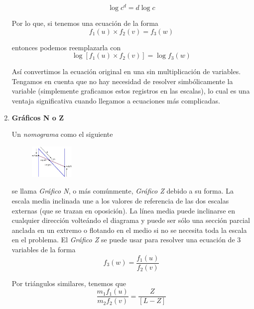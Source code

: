 \documentclass[letterpaper,11pt]{article}
\begin{document}
\begin{enumerate}
    \begin{equation*}
        \log c^d = d \log c
    \end{equation*}

    Por lo que, si tenemos una ecuación de la forma 
    \begin{equation*}
        f_1 (u) \times f_2 (v) = f_3 (w)
    \end{equation*}

    entonces podemos reemplazarla con 
    \begin{equation*}
        \log [f_1 (u) \times f_2 (v)] = \log f_3 (w)
    \end{equation*}

    Así convertimos la ecuación original en una sin multiplicación de variables.
    Tengamos en cuenta que no hay necesidad de resolver simbólicamente la 
    variable (simplemente graficamos estos registros en las escalas), lo cual 
    es una ventaja significativa cuando llegamos a ecuaciones más complicadas.

    \item \textbf{Gráficos N o Z}
    
    Un \textit{nomograma} como el siguiente 
    \begin{figure}[htb]
        \centering
        \includegraphics[width=0.2\textwidth]{./imagenes/geometry2.jpg}
    \end{figure} 

    se llama \textit{Gráfico N}, o más comúnmente, \textit{Gráfico Z} debido a 
    su forma. La escala media inclinada une a los valores de referencia de 
    las dos escalas externas (que se trazan en oposición). La línea media puede 
    inclinarse en cualquier dirección volteándo el diagrama y puede ser sólo una 
    sección parcial anclada en un extremo o flotando en el medio si no se 
    necesita toda la escala en el problema. El \textit{Gráfico Z} se puede usar
    para resolver una ecuación de $3$ variables de la forma 
    \begin{equation*}
        f_{3} (w) = \frac{f_{1} (u)}{f_{2} (v)}
    \end{equation*} 

    Por triángulos similares, tenemos que 
    \begin{equation*}
        \frac{m_{1}f_{1} (u)}{m_{2}f_{2} (v)} = \frac{Z}{[L-Z]}
    \end{equation*}
    

\end{enumerate}
\end{document}
